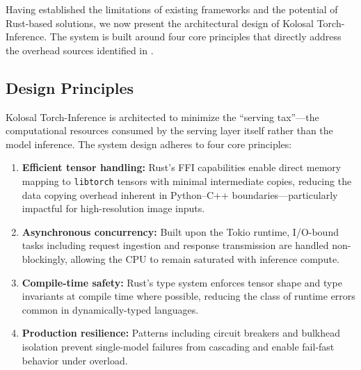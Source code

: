 \documentclass[10pt,twocolumn,a4paper]{article}
\theoremstyle{definition}
\theoremstyle{plain}
\begin{document}
Having established the limitations of existing frameworks and the potential of Rust-based solutions, we now present the architectural design of Kolosal Torch-Inference. The system is built around four core principles that directly address the overhead sources identified in .

\subsection{Design Principles}

Kolosal Torch-Inference is architected to minimize the ``serving tax''---the computational resources consumed by the serving layer itself rather than the model inference. The system design adheres to four core principles:
\begin{enumerate}
    \item \textbf{Efficient tensor handling:} Rust's FFI capabilities enable direct memory mapping to \texttt{libtorch} tensors with minimal intermediate copies, reducing the data copying overhead inherent in Python--C++ boundaries---particularly impactful for high-resolution image inputs.
    \item \textbf{Asynchronous concurrency:} Built upon the Tokio runtime, I/O-bound tasks including request ingestion and response transmission are handled non-blockingly, allowing the CPU to remain saturated with inference compute.
    \item \textbf{Compile-time safety:} Rust's type system enforces tensor shape and type invariants at compile time where possible, reducing the class of runtime errors common in dynamically-typed languages.
    \item \textbf{Production resilience:} Patterns including circuit breakers and bulkhead isolation prevent single-model failures from cascading and enable fail-fast behavior under overload.
\end{enumerate}
\end{document}
